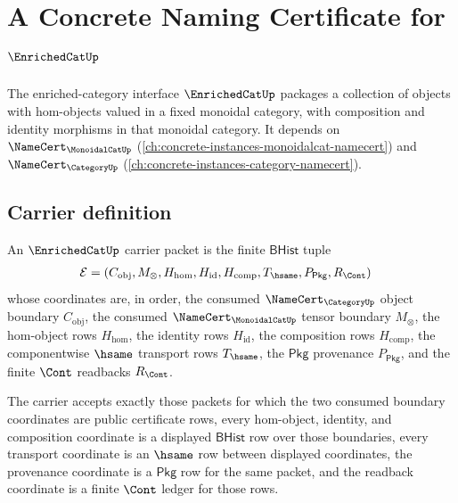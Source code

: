 \chapter{A Concrete Naming Certificate for $\EnrichedCatUp$}
\label{ch:concrete-instances-enrichedcat-namecert}

The enriched-category interface $\EnrichedCatUp$ packages a collection of objects with hom-objects valued in a fixed monoidal category, with composition and identity morphisms in that monoidal category. It depends on $\NameCert_{\MonoidalCatUp}$ (\autoref{ch:concrete-instances-monoidalcat-namecert}) and $\NameCert_{\CategoryUp}$ (\autoref{ch:concrete-instances-category-namecert}).

\section{Carrier definition}
\label{sec:enrichedcat-carrier}

\begin{definition}\label{def:enrichedcat-bhist-packet}
An $\EnrichedCatUp$ carrier packet is the finite $\mathsf{BHist}$ tuple
$$
\begin{aligned}
\mathcal{E} =
(&C_{\mathrm{obj}},M_{\otimes},
  H_{\mathrm{hom}},H_{\mathrm{id}},H_{\mathrm{comp}},
  T_{\hsame},P_{\mathsf{Pkg}},R_{\Cont})
\end{aligned}
$$
whose coordinates are, in order, the consumed
$\NameCert_{\CategoryUp}$ object boundary $C_{\mathrm{obj}}$, the consumed
$\NameCert_{\MonoidalCatUp}$ tensor boundary $M_{\otimes}$, the hom-object
rows $H_{\mathrm{hom}}$, the identity rows $H_{\mathrm{id}}$, the composition
rows $H_{\mathrm{comp}}$, the componentwise $\hsame$ transport rows
$T_{\hsame}$, the $\mathsf{Pkg}$ provenance $P_{\mathsf{Pkg}}$, and the finite
$\Cont$ readbacks $R_{\Cont}$.

The carrier accepts exactly those packets for which the two consumed boundary
coordinates are public certificate rows, every hom-object, identity, and
composition coordinate is a displayed $\mathsf{BHist}$ row over those
boundaries, every transport coordinate is an $\hsame$ row between displayed
coordinates, the provenance coordinate is a $\mathsf{Pkg}$ row for the same
packet, and the readback coordinate is a finite $\Cont$ ledger for those rows.
\end{definition}

